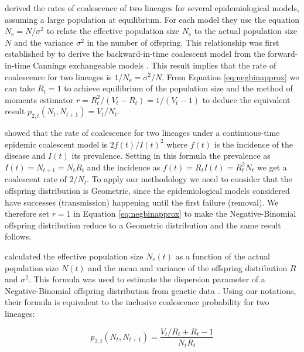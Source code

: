 \documentclass{article}
\renewcommand{\eqref}[1]{\ref{#1}}
\begin{document}
\citet{koelleRatesCoalescenceCommon2012} derived the rates of coalescence of two lineages 
for several epidemiological models, assuming a large population at equilibrium.
For each model they use the equation $N_\mathrm{e}=N/\sigma^2$ to relate the effective population
size $N_\mathrm{e}$ to the actual population size $N$ and the variance $\sigma^2$ in the number
of offspring. This relationship was first established by \citet{Kingman1982} to
derive the backward-in-time coalescent model from the forward-in-time
Cannings exchangeable models \citep{Cannings1974}. 
This result implies that the rate of coalescence for two lineages is 
$1/N_\mathrm{e}=\sigma^2/N$.
From Equation \eqref{eq:negbinapprox} we can take $R_t=1$ to achieve 
equilibrium of the population size and the method of moments estimator
$r=R_t^2/(V_t-R_t)=1/(V_t-1)$ to deduce 
the equivalent result $p_{2,t}(N_t,N_{t+1})=V_t/N_t$. 

\citet{Volz2012a} showed that the rate of coalescence for two lineages under a continuous-time epidemic coalescent model is $2f(t)/I(t)^2$
 where $f(t)$ is the incidence of the disease and $I(t)$ its prevalence. 
 Setting in this formula the prevalence as $I(t)=N_{t+1}=N_t R_t$ and the incidence as
 $f(t)=R_t I(t)=R_t^2 N_t$ we get a coalescent rate of 
 $2/N_t$. To apply our methodology we need to consider that
the offspring distribution is Geometric, since the epidemiological
 models considered have successes (transmission) happening until the first failure
 (removal). We therefore set $r=1$ in Equation \eqref{eq:negbinapprox} 
 to make the Negative-Binomial offspring distribution
 reduce to a Geometric distribution and the same result follows.

\citet{Fraser2017} calculated the effective population size $N_\mathrm{e}(t)$ 
as a function of the actual population size $N(t)$ and the mean and variance of the offspring distribution $R$ and $\sigma^2$. %
This formula was used to estimate the dispersion parameter of a Negative-Binomial offspring distribution from genetic data \citep{Li2017}.
Using our notations, their formula is equivalent to the inclusive coalescence 
probability for two lineages:

\begin{equation}
 p_{2,t}(N_t, N_{t+1})=\frac{V_t/R_t+R_t-1}{N_t R_t}\label{eq:fraser}
 \end{equation}
\end{document}
